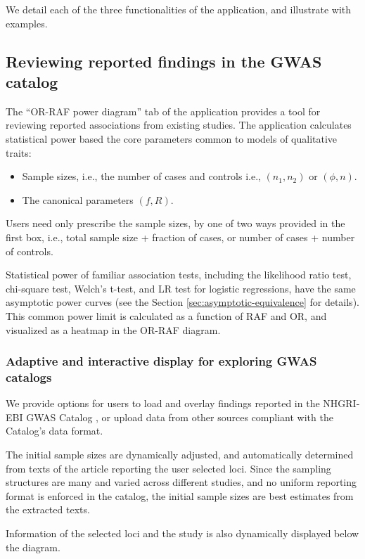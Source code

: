 
We detail each of the three functionalities of the application, and illustrate with examples.

\subsection{Reviewing reported findings in the GWAS catalog}

The ``OR-RAF power diagram'' tab of the application provides a tool for reviewing reported associations from existing studies.
The application calculates statistical power based the core parameters common to models of qualitative traits:

\begin{itemize}
    \item Sample sizes, i.e., the number of cases and controls i.e., $(n_1, n_2)$ or $(\phi, n)$.
    \item The canonical parameters $(f, R)$.
\end{itemize}

Users need only prescribe the sample sizes, by one of two ways provided in the first box, i.e., total sample size + fraction of cases, or number of cases + number of controls.

Statistical power of familiar association tests, including the likelihood ratio test, chi-square test, Welch's t-test, and LR test for logistic regressions, have the same asymptotic power curves
(see the Section \ref{sec:asymptotic-equivalence} for details).
This common power limit is calculated as a function of RAF and OR, and visualized as a heatmap in the OR-RAF diagram. 

\subsubsection{Adaptive and interactive display for exploring GWAS catalogs}

We provide options for users to load and overlay findings reported in the NHGRI-EBI GWAS Catalog \citep{MacArthur16}, or upload data from other sources compliant with the Catalog's data format.

The initial sample sizes are dynamically adjusted, and automatically determined from texts of the article reporting the user selected loci.
Since the sampling structures are many and varied across different studies, and no uniform reporting format is enforced in the catalog, the initial sample sizes are best estimates from the extracted texts.

Information of the selected loci and the study is also dynamically displayed below the diagram.


